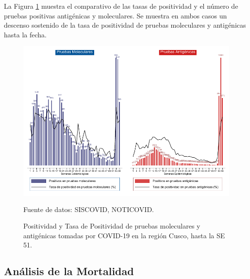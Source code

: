 \documentclass[12pt,a4paper,openany]{book}
\begin{document}
La Figura \ref{fig:positividad_ambas} muestra el comparativo de las tasas de positividad y el número de pruebas positivas antigénicas y moleculares. Se muestra en ambos casos un descenso sostenido de la tasa de positividad de pruebas moleculares y antigénicas hasta la fecha. 
\begin{landscape}
   \begin{figure}[h]
	\caption{Positividad y Tasa de Positividad de pruebas moleculares y antigénicas tomadas por COVID-19 en la región Cusco, hasta la SE 51.}\label{fig:positividad_ambas}
   	\begin{center}
   		\includegraphics[width=0.85\linewidth]{../figuras/positividad_ambas.pdf}
   	\end{center}
   	{\footnotesize {Fuente de datos: SISCOVID, NOTICOVID.}}
   \end{figure}
\end{landscape}
\clearpage

	\subsection*{Análisis de la Mortalidad}
\end{document}
